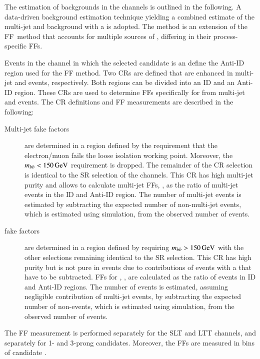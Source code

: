 The estimation of \jettotauhadvis backgrounds in the \lephad channels is
outlined in the following. A data-driven background estimation technique
yielding a combined estimate of the multi-jet and \ttbar background with a
\faketauhadvis is adopted. The method is an extension of the FF~method
that accounts for multiple sources of \faketauhadvis, differing in their
process-specific FFs.

Events in the \lephad channel in which the selected \tauhadvis candidate is an
\antitau define the Anti-ID region used for the FF method. Two CRs are defined
that are enhanced in multi-jet and \ttbar events, respectively. Both regions can
be divided into an ID and an Anti-ID region. These CRs are used to determine FFs
specifically for \faketauhadvis from multi-jet and \ttbar events. The CR
definitions and FF measurements are described in the following:
\begin{description}

\item[Multi-jet fake factors] are determined in a region defined by the
  requirement that the electron/muon fails the loose isolation working
  point. Moreover, the $m_{bb} < \SI{150}{\ensuremath{\text{GeV}}}$ requirement is dropped. The
  remainder of the CR selection is identical to the SR selection of the \lephad
  channels. This CR has high multi-jet purity and allows to calculate multi-jet
  FFs, \FFqcd, as the ratio of multi-jet events in the ID and Anti-ID
  region. The number of multi-jet events is estimated by subtracting the
  expected number of non-multi-jet events, which is estimated using simulation,
  from the observed number of events.

\item[\ttbar fake factors] are determined in a region defined by requiring
  $m_{bb} > \SI{150}{\ensuremath{\text{GeV}}}$ with the other selections remaining identical to the
  SR selection. This CR has high \ttbar purity but is not pure in \ttbarFakes
  events due to contributions of \ttbar events with a \truetauhadvis that have
  to be subtracted. FFs for \ttbar, \FFttbar, are calculated as the ratio of
  \ttbarFakes events in ID and Anti-ID regions. The number of \ttbarFakes events
  is estimated, assuming negligible contribution of multi-jet events, by
  subtracting the expected number of non-\ttbarFakes events, which is estimated
  using simulation, from the observed number of events.

\end{description}
The FF measurement is performed separately for the \lephad SLT and LTT channels,
and separately for 1- and 3-prong \tauhadvis candidates. Moreover, the FFs are
measured in bins of \tauhadvis candidate \pT.


